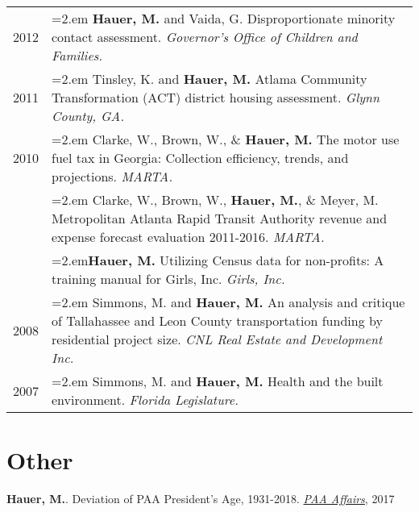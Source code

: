 \begin{tabularx}{\linewidth}{lX}
2012    & \hangindent=2.em \textbf{Hauer, M.} and Vaida, G. Disproportionate minority contact assessment. \textit{Governor's Office of Children and                  Families.}\\
2011   & \hangindent=2.em Tinsley, K. and \textbf{Hauer, M.} Atlama Community Transformation (ACT) district housing assessment. \textit{Glynn County,               GA.}\\
2010    & \hangindent=2.em Clarke, W., Brown, W., \& \textbf{Hauer, M.} The motor use fuel tax in Georgia: Collection efficiency, trends, and                        projections. \textit{MARTA.}\\
       & \hangindent=2.em Clarke, W., Brown, W., \textbf{Hauer, M.}, \& Meyer, M. Metropolitan Atlanta Rapid Transit Authority revenue and expense         forecast evaluation 2011-2016. \textit{MARTA.}\\
      & \hangindent=2.em\textbf{Hauer, M.} Utilizing Census data for non-profits: A training manual for Girls, Inc. \textit{Girls, Inc.}\\
2008    & \hangindent=2.em Simmons, M. and \textbf{Hauer, M.} An analysis and critique of Tallahassee and Leon County transportation funding by                      residential project size. \textit{CNL Real Estate and Development Inc.}\\
2007    & \hangindent=2.em Simmons, M. and \textbf{Hauer, M.} Health and the built environment. \textit{Florida Legislature.}\\
\end{tabularx}

\section{Other}

\textbf{Hauer, M.}. Deviation of PAA President's Age, 1931-2018. \href{http://www.populationassociation.org/wp-content/uploads/PAA-Fall-2017.pdf}{\textit{PAA Affairs}}, 2017
